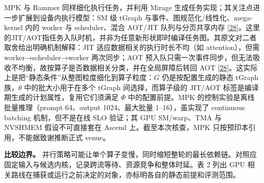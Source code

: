 \documentclass[
  UTF8,
  zihao=5]{ctexart}
\begin{document}
MPK 与 Rammer 同样细化执行任务，并利用 Mirage
生成任务实现；其关注点进一步扩展到设备内执行模型：SM 级 tGraph
与事件、图规范化/线性化、mega-kernel 内的 worker 与 scheduler、混合
AOT/JIT 队列与分页共享内存
{[}\protect\hyperlink{ref-cheng2026mpk}{28}{]}。这里的JIT/AOT指任务入队时机，并非为任意新形状即时编译任务图。其原文对二者取舍给出明确机制解释：JIT
适应数据相关的执行时长不均（如 attention），但需 worker→scheduler→worker
两次同步；AOT
预入队只需一次事件同步，但无法吸收不均衡，故按算子是否数据相关分类，并在全局屏障后转回
AOT
{[}\protect\hyperlink{ref-cheng2026mpk}{28}{]}。这实际上是把``静态条件''从整图粒度细化到算子粒度：\(G\)
仍是按配置生成的静态 tGraph 族，\(\theta\) 中的批大小用于在多个 tGraph
间选择，而算子级的 JIT/AOT 标签是编译期生成的计划属性，复用它们须满足
\(\Phi\) 中的配置前提。MPK 的控制实验是离线批量推理（prompt 64、output
1024、最大批量 1--16），虽实现了 continuous batching 机制，但不是在线
SLO 验证；其 GPU SM/warp、TMA 与 NVSHMEM 假设不可直接套在 Ascend
上。截至本次核查，MPK 只按预印本引用，不能据致谢推断正式 venue。

\textbf{比较边界。}
并行策略可能让单个算子变慢，同时缩短整轮的最长依赖链。对照应固定输入与候选内核，记录跨流等待、资源竞争和整体时延。表
2 列出 GPU
相关路线在捕获或运行之前决定的对象，亦标明各自的静态前提和评测范围。
\end{document}
